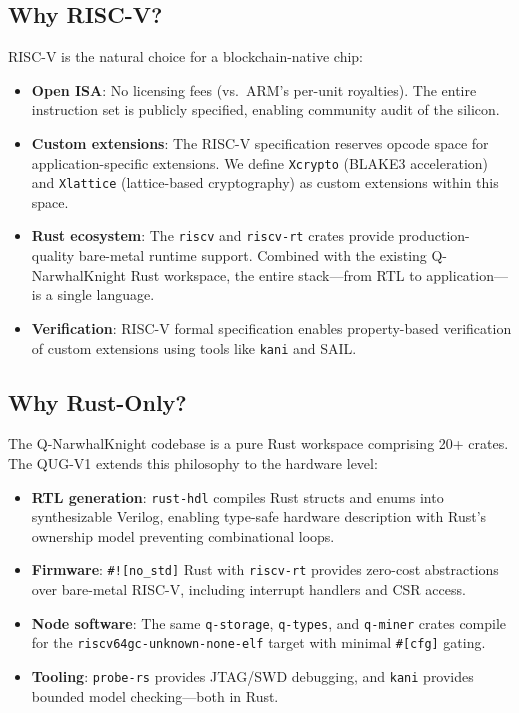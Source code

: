 \documentclass[11pt,a4paper]{article}
\begin{document}
\subsection{Why RISC-V?}

RISC-V is the natural choice for a blockchain-native chip:

\begin{itemize}
    \item \textbf{Open ISA}: No licensing fees (vs.\ ARM's per-unit royalties). The entire instruction set is publicly specified, enabling community audit of the silicon.
    \item \textbf{Custom extensions}: The RISC-V specification reserves opcode space for application-specific extensions. We define \texttt{Xcrypto} (BLAKE3 acceleration) and \texttt{Xlattice} (lattice-based cryptography) as custom extensions within this space.
    \item \textbf{Rust ecosystem}: The \texttt{riscv} and \texttt{riscv-rt} crates provide production-quality bare-metal runtime support. Combined with the existing Q-NarwhalKnight Rust workspace, the entire stack---from RTL to application---is a single language.
    \item \textbf{Verification}: RISC-V formal specification enables property-based verification of custom extensions using tools like \texttt{kani} and SAIL.
\end{itemize}

\subsection{Why Rust-Only?}

The Q-NarwhalKnight codebase is a pure Rust workspace comprising 20+ crates. The QUG-V1 extends this philosophy to the hardware level:

\begin{itemize}
    \item \textbf{RTL generation}: \texttt{rust-hdl} compiles Rust structs and enums into synthesizable Verilog, enabling type-safe hardware description with Rust's ownership model preventing combinational loops.
    \item \textbf{Firmware}: \texttt{\#![no\_std]} Rust with \texttt{riscv-rt} provides zero-cost abstractions over bare-metal RISC-V, including interrupt handlers and CSR access.
    \item \textbf{Node software}: The same \texttt{q-storage}, \texttt{q-types}, and \texttt{q-miner} crates compile for the \texttt{riscv64gc-unknown-none-elf} target with minimal \texttt{\#[cfg]} gating.
    \item \textbf{Tooling}: \texttt{probe-rs} provides JTAG/SWD debugging, and \texttt{kani} provides bounded model checking---both in Rust.
\end{itemize}
\end{document}
